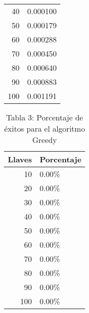 \documentclass[a4paper]{article}
\begin{document}
\begin{center}
\begin{table}[ht]
\begin{tabular}{r|l}
40&0.000100\\
50&0.000179\\
60&0.000288\\
70&0.000450\\
80&0.000640\\
90&0.000883\\
100&0.001191\\
\end{tabular}
\end{table}
\begin{table}[ht]
\centering
\caption*{Tabla 3: Porcentaje de \'exitos para el algoritmo Greedy}
\label{4}
\begin{tabular}{r|l}
Llaves & Porcentaje \\ \hline
10&0.00\%\\
20&0.00\%\\
30&0.00\%\\
40&0.00\%\\
50&0.00\%\\
60&0.00\%\\
70&0.00\%\\
80&0.00\%\\
90&0.00\%\\
100&0.00\%\\
\end{tabular}
\end{table}
\end{center}
\end{document}
